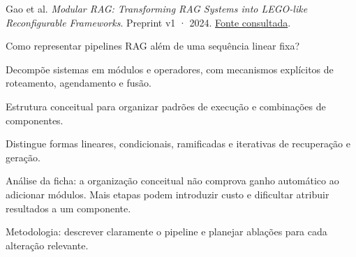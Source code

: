 {\small Gao et al. \textit{Modular RAG: Transforming RAG Systems into LEGO-like Reconfigurable Frameworks}. Preprint v1 · 2024. \href{https://arxiv.org/pdf/2407.21059v1}{Fonte consultada}.\par}

Como representar pipelines RAG além de uma sequência linear fixa?

Decompõe sistemas em módulos e operadores, com mecanismos explícitos de roteamento, agendamento e fusão.

Estrutura conceitual para organizar padrões de execução e combinações de componentes.

Distingue formas lineares, condicionais, ramificadas e iterativas de recuperação e geração.

\begin{itemize}
\end{itemize}

Análise da ficha: a organização conceitual não comprova ganho automático ao adicionar módulos. Mais etapas podem introduzir custo e dificultar atribuir resultados a um componente.

Metodologia: descrever claramente o pipeline e planejar ablações para cada alteração relevante.

